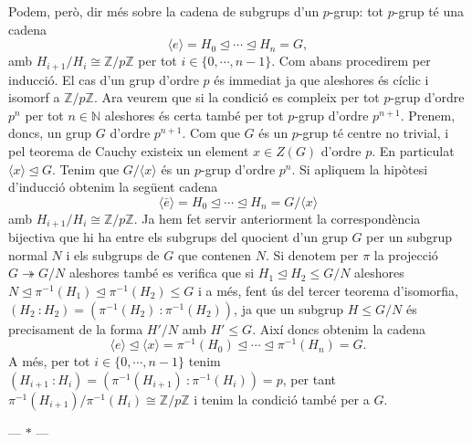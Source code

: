 \documentclass[12pt]{article}
\newcommand{\Z}{\mathbb{Z}}
\newcommand{\N}{\mathbb{N}}
\newcommand{\gen}[1]{\langle #1 \rangle}
\newcommand{\normal}{\trianglelefteq}
\newcommand{\parbreak}{
	\begin{center}
		--- $\ast$ ---
	\end{center} 
}
\begin{document}
Podem, però, dir més sobre la cadena de subgrups d'un \( p \)-grup: tot \( p \)-grup té una cadena
\begin{equation*}
	\gen{e} = H_0 \normal \cdots \normal H_n = G,
\end{equation*}
amb \( H_{i+1}/H_i \cong \Z/p\Z \) per tot \( i \in \{0, \cdots, n-1 \} \). Com abans procedirem per inducció. El cas d'un grup d'ordre \( p \) és immediat ja que aleshores és cíclic i isomorf a \( \Z/p\Z \). Ara veurem que si la condició es compleix per tot \( p \)-grup d'ordre \( p^n \) per tot \( n \in \N \) aleshores és certa també per tot \( p \)-grup d'ordre \( p^{n+1} \). Prenem, doncs, un grup \( G \) d'ordre \( p^{n+1} \). Com que \( G \) és un \( p \)-grup té centre no trivial, i pel teorema de Cauchy existeix un element \( x \in Z(G) \) d'ordre \( p \). En particulat \( \gen{x} \normal G \). Tenim que \( G/\gen{x} \) és un \( p \)-grup d'ordre \( p^n \). Si apliquem la hipòtesi d'inducció obtenim la següent cadena
\begin{equation*}
	\gen{\bar{e}} = H_0 \normal \cdots \normal H_n = G/\gen{x}
\end{equation*}
amb \( H_{i+1}/H_i \cong \Z/p\Z \). Ja hem fet servir anteriorment la correspondència bijectiva que hi ha entre els subgrups del quocient d'un grup \( G \) per un subgrup normal \( N \) i els subgrups de \( G \) que contenen \( N \). Si denotem per \( \pi \) la projecció \( G \twoheadrightarrow G/N \) aleshores també es verifica que si \( H_1 \normal H_2 \leq G/N \) aleshores \( N \normal \pi^{-1}(H_1) \normal \pi^{-1}(H_2) \leq G \) i a més, fent ús del tercer teorema d'isomorfia, \( (H_2 \ \colon H_2) = (\pi^{-1}(H_2) \ \colon \pi^{-1}(H_2)) \), ja que un subgrup \( H \leq G/N \) és precisament de la forma \( H'/N \) amb \( H' \leq G \). Així doncs obtenim la cadena 
\begin{equation*}
	\gen{e} \normal \gen{x} = \pi^{-1}(H_0) \normal \cdots \normal \pi^{-1}(H_n) = G.
\end{equation*}
A més, per tot \( i \in \{0, \cdots, n-1\} \) tenim \( (H_{i+1} \ \colon H_i) = (\pi^{-1}(H_{i+1}) \ \colon \pi^{-1}(H_i)) = p \), per tant \( \pi^{-1}(H_{i+1}) / \pi^{-1}(H_i) \cong \Z/p\Z \) i tenim la condició també per a \( G \). 

\parbreak
\end{document}
